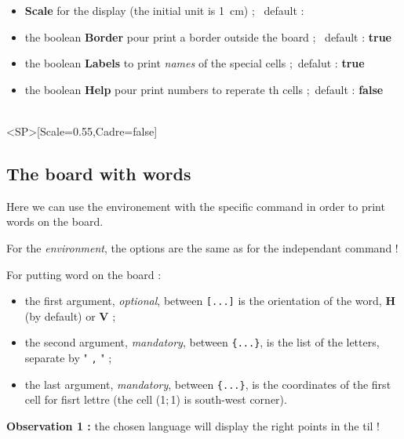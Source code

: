 \documentclass{article}
\newcommand\Cle[1]{{\bfseries\sffamily\textlangle #1\textrangle}}
\begin{document}
\begin{itemize}
	\item \Cle{Scale} for the display (the initial unit is 1~cm) ; \hfill~default : \Cle{1}
	\item the boolean \Cle{Border} pour print a border outside the board ; \hfill~default : \Cle{true}
	\item the boolean \Cle{Labels} to print \textit{names} of the special cells ;\hfill~defalut : \Cle{true}
	\item the boolean \Cle{Help} pour print numbers to reperate th cells ;\hfill~default : \Cle{false}
\end{itemize}

\begin{PresentationCode}{}
\ScrabbleBoard[Labels=false,Scale=0.55]\\
\ScrabbleBoard<SP>[Scale=0.55,Cadre=false]
\end{PresentationCode}

\newpage

\subsection{The board with words}

Here we can use the \textsf{environement} with the specific \textsf{command} in order to print words on the board.

\smallskip

For the \textit{environment}, the options are the same as for the independant \textsf{command} !

\smallskip

For putting word on the board :

\begin{itemize}
	\item the first argument, \textit{optional}, between \texttt{[...]} is the orientation of the word, \Cle{H} (by default) or \Cle{V} ;
	\item the second argument, \textit{mandatory}, between \texttt{\{...\}}, is the list of the letters, separate by " \texttt{,} " ;
	\item the last argument, \textit{mandatory}, between \texttt{\{...\}}, is the coordinates of the first cell for fisrt lettre (the cell (1;\,1) is south-west corner).
\end{itemize}

\textbf{Observation 1 :} the chosen language will display the right points in the til !
\end{document}
